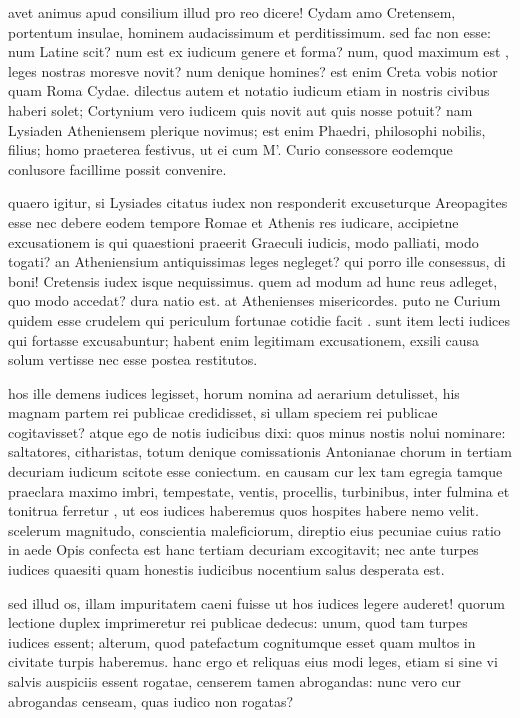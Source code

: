  avet animus apud consilium illud pro reo dicere! Cydam amo Cretensem, portentum insulae, hominem audacissimum et perditissimum. sed fac non esse: num Latine scit? num est ex iudicum genere et forma? num, quod maximum est , leges nostras moresve novit? num denique homines? est enim Creta vobis notior quam Roma Cydae. dilectus autem et notatio iudicum etiam in nostris civibus haberi solet; Cortynium vero iudicem quis novit aut quis nosse potuit? nam Lysiaden Atheniensem plerique novimus; est enim Phaedri, philosophi nobilis, filius; homo praeterea festivus, ut ei cum M'. Curio consessore eodemque conlusore facillime possit convenire.

 quaero igitur, si Lysiades citatus iudex non responderit excuseturque Areopagites esse nec debere eodem tempore Romae et Athenis res iudicare, accipietne excusationem is qui quaestioni praeerit Graeculi iudicis, modo palliati, modo togati? an Atheniensium antiquissimas leges negleget? qui porro ille consessus, di boni! Cretensis iudex isque nequissimus. quem ad modum ad hunc reus adleget, quo modo accedat? dura natio est. at Athenienses misericordes. puto ne Curium quidem esse crudelem qui periculum fortunae cotidie facit . sunt item lecti iudices qui fortasse excusabuntur; habent enim legitimam excusationem, exsili causa solum vertisse nec esse postea restitutos.

 hos ille demens iudices legisset, horum nomina ad aerarium detulisset, his magnam partem rei publicae credidisset, si ullam speciem rei publicae cogitavisset? atque ego de notis iudicibus dixi: quos minus nostis nolui nominare: saltatores, citharistas, totum denique comissationis Antonianae chorum in tertiam decuriam iudicum scitote esse coniectum. en causam cur lex tam egregia tamque praeclara maximo imbri, tempestate, ventis, procellis, turbinibus, inter fulmina et tonitrua ferretur , ut eos iudices haberemus quos hospites habere nemo velit. scelerum magnitudo, conscientia maleficiorum, direptio eius pecuniae cuius ratio in aede Opis confecta est hanc tertiam decuriam excogitavit; nec ante turpes iudices quaesiti quam honestis iudicibus nocentium salus desperata est.

 sed illud os, illam impuritatem caeni fuisse ut hos iudices legere auderet! quorum lectione duplex imprimeretur rei publicae dedecus: unum, quod tam turpes iudices essent; alterum, quod patefactum cognitumque esset quam multos in civitate turpis haberemus. hanc ergo et reliquas eius modi leges, etiam si sine vi salvis auspiciis essent rogatae, censerem tamen abrogandas: nunc vero cur abrogandas censeam, quas iudico non rogatas?

